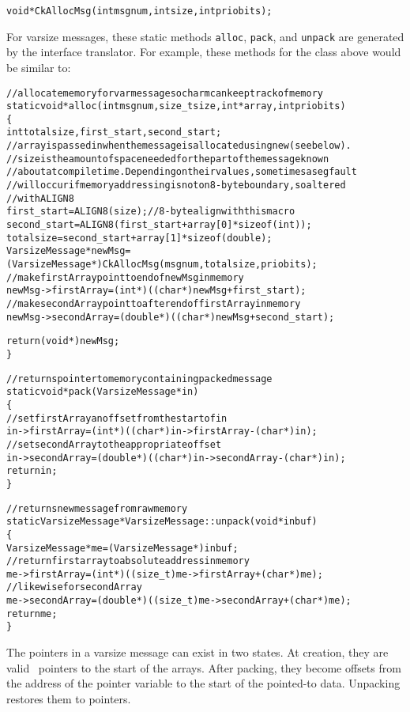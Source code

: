 \begin{alltt}
void *CkAllocMsg(int msgnum, int size, int priobits); 
\end{alltt}  


For varsize messages, these static methods \texttt{alloc}, \texttt{pack}, and 
\texttt{unpack} are
generated by the interface translator.  For example, these
methods for the  class above would be similar to:

\begin{alltt}
// allocate memory for varmessage so charm can keep track of memory
static void* alloc(int msgnum, size_t size, int* array, int priobits)
\{
  int totalsize, first_start, second_start;
  // array is passed in when the message is allocated using new (see below).
  // size is the amount of space needed for the part of the message known
  // about at compile time.  Depending on their values, sometimes a segfault
  // will occur if memory addressing is not on 8-byte boundary, so altered
  // with ALIGN8
  first_start = ALIGN8(size);  // 8-byte align with this macro
  second_start = ALIGN8(first_start + array[0]*sizeof(int));
  totalsize = second_start + array[1]*sizeof(double);
  VarsizeMessage* newMsg = 
    (VarsizeMessage*) CkAllocMsg(msgnum, totalsize, priobits);
  // make firstArray point to end of newMsg in memory
  newMsg->firstArray = (int*) ((char*)newMsg + first_start);
  // make secondArray point to after end of firstArray in memory
  newMsg->secondArray = (double*) ((char*)newMsg + second_start);

  return (void*) newMsg;
\}

// returns pointer to memory containing packed message
static void* pack(VarsizeMessage* in)
\{
  // set firstArray an offset from the start of in
  in->firstArray = (int*) ((char*)in->firstArray - (char*)in);
  // set secondArray to the appropriate offset
  in->secondArray = (double*) ((char*)in->secondArray - (char*)in);
  return in;
\}

// returns new message from raw memory
static VarsizeMessage* VarsizeMessage::unpack(void* inbuf)
\{
  VarsizeMessage* me = (VarsizeMessage*)inbuf;
  // return first array to absolute address in memory
  me->firstArray = (int*) ((size_t)me->firstArray + (char*)me);
  // likewise for secondArray
  me->secondArray = (double*) ((size_t)me->secondArray + (char*)me);
  return me;
\}
\end{alltt}

The pointers in a varsize message can exist in two states.  At creation, they
are valid \CC\ pointers to the start of the arrays.  After packing, they become
offsets from the address of the pointer variable to the start of the pointed-to
data.  Unpacking restores them to pointers. 


